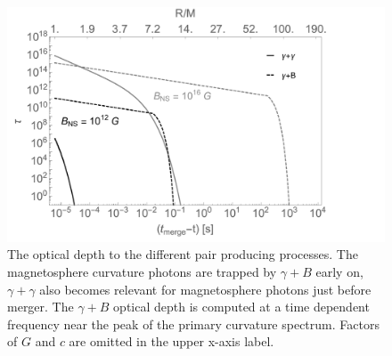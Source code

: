 \begin{figure}
\begin{center} \vspace{-20pt}
\includegraphics[scale=0.38]{figures/ch7/tauGB_and_tauGG_vs_t.pdf}
\end{center}
\caption{The optical depth to the different pair producing
  processes. The magnetosphere curvature photons are trapped by
  $\gamma + B$ early on, $\gamma + \gamma$ also becomes relevant for
  magnetosphere photons just before merger. The $\gamma+B$ optical
  depth is computed at a time dependent frequency near the peak of the
  primary curvature spectrum. Factors of $G$ and $c$ are omitted in
  the upper x-axis label.}
\label{Fig:tauComp}
\end{figure}







